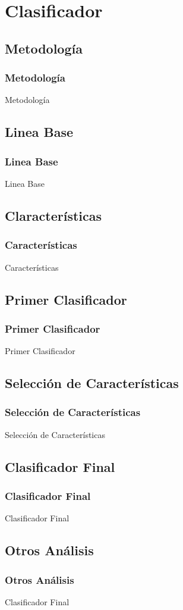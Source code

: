 \section{Clasificador} %

\subsection{Metodología}
\begin{frame}
\frametitle{Metodología}
Metodología
\end{frame}

\subsection{Linea Base}
\begin{frame}
\frametitle{Linea Base}
Linea Base
\end{frame}

\subsection{Claracterísticas}
\begin{frame}
\frametitle{Características}
Características
\end{frame}

\subsection{Primer Clasificador}
\begin{frame}
\frametitle{Primer Clasificador}
Primer Clasificador
\end{frame}

\subsection{Selección de Características}
\begin{frame}
\frametitle{Selección de Características}
Selección de Características
\end{frame}

\subsection{Clasificador Final}
\begin{frame}
\frametitle{Clasificador Final}
Clasificador Final
\end{frame}

\subsection{Otros Análisis}
\begin{frame}
\frametitle{Otros Análisis}
Clasificador Final
\end{frame}